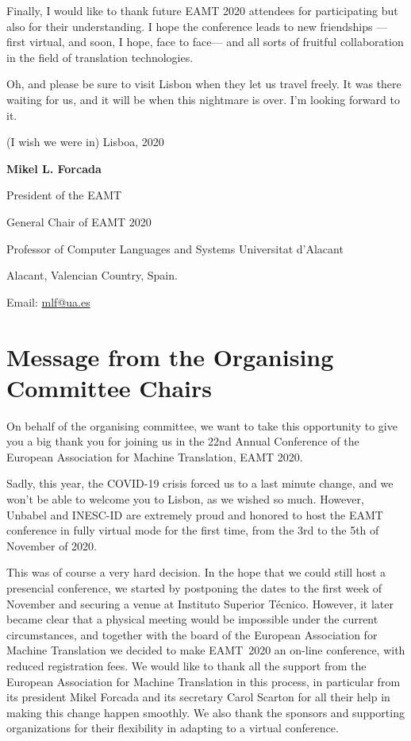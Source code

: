 \documentclass[a4paper,11pt,twoside]{book}
\begin{document}
\begin{onehalfspacing}
Finally, I would like to thank future EAMT 2020 attendees for participating but also for their understanding. I hope
the conference leads to new friendships ---first virtual, and soon, I hope, face to face--- and all sorts of fruitful collaboration in the field of translation technologies. 

Oh, and please be sure to visit Lisbon when they let us travel freely. It was there waiting for us, and it will be when this nightmare is over. I'm looking forward to it.

\vspace{1cm}

\noindent (I wish we were in) Lisboa, 2020

\vspace{1cm}

\noindent \textbf{Mikel L. Forcada}

\noindent President of the EAMT

\noindent General Chair of EAMT 2020

\noindent Professor of Computer Languages and Systems
\noindent Universitat d'Alacant

\noindent Alacant, Valencian Country, Spain.

\noindent Email: \url{mlf@ua.es}


\chapter*{Message from the Organising Committee Chairs}

On behalf of the organising committee, we want to take this opportunity to give you a big thank you for joining us in the 22nd Annual Conference of the European Association for Machine Translation, EAMT 2020. 

Sadly, this year, the COVID-19 crisis forced us to a last minute change, and we won’t be able to welcome you to Lisbon, as we wished so much. However, Unbabel and INESC-ID are extremely proud and honored to host the EAMT conference in fully virtual mode for the first time, from the 3rd to the 5th of November of 2020. 

This was of course a very hard decision. In the hope that we could still host a presencial conference, we started by postponing the dates to the first week of November and securing a venue at Instituto Superior Técnico. However, it later became clear that a physical meeting would be impossible under the current circumstances, and together with the board of the European Association for Machine Translation we decided to make EAMT~2020 an on-line conference, with reduced registration fees. We would like to thank all the support from the European Association for Machine Translation in this process, in particular from its president Mikel Forcada and its secretary Carol Scarton for all their help in making this change happen smoothly. We also thank the sponsors and supporting organizations for their flexibility in adapting to a virtual conference.


\end{onehalfspacing}
\end{document}
